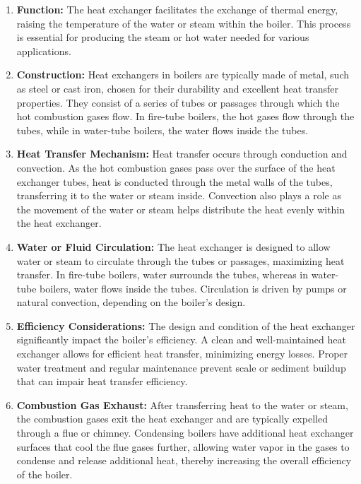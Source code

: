 \begin{enumerate}
    \item \textbf{Function:} The heat exchanger facilitates the exchange of thermal energy, raising the temperature of the water or steam within the boiler. This process is essential for producing the steam or hot water needed for various applications.
    \item \textbf{Construction:} Heat exchangers in boilers are typically made of metal, such as steel or cast iron, chosen for their durability and excellent heat transfer properties. They consist of a series of tubes or passages through which the hot combustion gases flow. In fire-tube boilers, the hot gases flow through the tubes, while in water-tube boilers, the water flows inside the tubes.
    \item \textbf{Heat Transfer Mechanism:} Heat transfer occurs through conduction and convection. As the hot combustion gases pass over the surface of the heat exchanger tubes, heat is conducted through the metal walls of the tubes, transferring it to the water or steam inside. Convection also plays a role as the movement of the water or steam helps distribute the heat evenly within the heat exchanger.
    \item \textbf{Water or Fluid Circulation:} The heat exchanger is designed to allow water or steam to circulate through the tubes or passages, maximizing heat transfer. In fire-tube boilers, water surrounds the tubes, whereas in water-tube boilers, water flows inside the tubes. Circulation is driven by pumps or natural convection, depending on the boiler's design.
    \item \textbf{Efficiency Considerations:} The design and condition of the heat exchanger significantly impact the boiler's efficiency. A clean and well-maintained heat exchanger allows for efficient heat transfer, minimizing energy losses. Proper water treatment and regular maintenance prevent scale or sediment buildup that can impair heat transfer efficiency.
    \item \textbf{Combustion Gas Exhaust:} After transferring heat to the water or steam, the combustion gases exit the heat exchanger and are typically expelled through a flue or chimney. Condensing boilers have additional heat exchanger surfaces that cool the flue gases further, allowing water vapor in the gases to condense and release additional heat, thereby increasing the overall efficiency of the boiler.
\end{enumerate}

